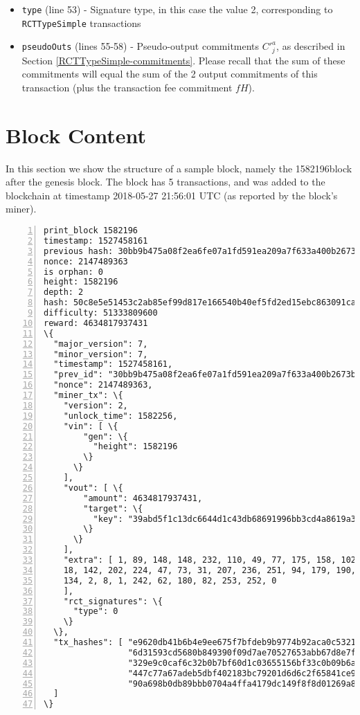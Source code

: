 \begin{appendices}
\begin{itemize}
	\item {\tt type} (line 53) - Signature type, in this case the value 2, corresponding to {\tt RCTTypeSimple} transactions
    \item {\tt pseudoOuts} (lines 55-58) - Pseudo-output commitments $C'^a_j$, as described in Section  \ref{RCTTypeSimple-commitments}. Please recall that the sum of these commitments will equal the sum of the 2 output commitments of this transaction (plus the transaction fee commitment $f H$).
\end{itemize}




\chapter{Block Content}
\label{appendix:block-content}

In this section we show the structure of a sample block, namely the 1582196\nth block after the genesis block. The block has 5 transactions, and was added to the blockchain at timestamp 2018-05-27 21:56:01 UTC (as reported by the block's miner).


\begin{Verbatim}[commandchars=\\\{\}, numbers=left]
print_block 1582196
timestamp: 1527458161
previous hash: 30bb9b475a08f2ea6fe07a1fd591ea209a7f633a400b2673b8835a975348b0eb
nonce: 2147489363
is orphan: 0
height: 1582196
depth: 2
hash: 50c8e5e51453c2ab85ef99d817e166540b40ef5fd2ed15ebc863091ca2a04594
difficulty: 51333809600
reward: 4634817937431
\{
  "major_version": 7,
  "minor_version": 7,
  "timestamp": 1527458161,
  "prev_id": "30bb9b475a08f2ea6fe07a1fd591ea209a7f633a400b2673b8835a975348b0eb",
  "nonce": 2147489363,
  "miner_tx": \{
    "version": 2,
    "unlock_time": 1582256,
    "vin": [ \{
        "gen": \{
          "height": 1582196
        \}
      \}
    ],
    "vout": [ \{
        "amount": 4634817937431,
        "target": \{
          "key": "39abd5f1c13dc6644d1c43db68691996bb3cd4a8619a37a227667cf2bf055401"
        \}
      \}
    ],
    "extra": [ 1, 89, 148, 148, 232, 110, 49, 77, 175, 158, 102, 45, 72, 201, 193,
    18, 142, 202, 224, 47, 73, 31, 207, 236, 251, 94, 179, 190, 71, 72, 251, 110, 
    134, 2, 8, 1, 242, 62, 180, 82, 253, 252, 0
    ],
    "rct_signatures": \{
      "type": 0
    \}
  \},
  "tx_hashes": [ "e9620db41b6b4e9ee675f7bfdeb9b9774b92aca0c53219247b8f8c7aecf773ae",
                 "6d31593cd5680b849390f09d7ae70527653abb67d8e7fdca9e0154e5712591bf",
                 "329e9c0caf6c32b0b7bf60d1c03655156bf33c0b09b6a39889c2ff9a24e94a54",
                 "447c77a67adeb5dbf402183bc79201d6d6c2f65841ce95cf03621da5a6bffefc",
                 "90a698b0db89bbb0704a4ffa4179dc149f8f8d01269a85f46ccd7f0007167ee4"
  ]
\}
\end{Verbatim}



\end{appendices}
